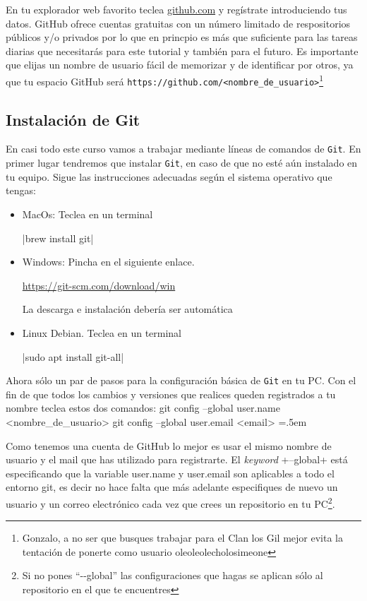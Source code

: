 \documentclass[a5paper,10pt]{article}
\newenvironment{cverbatim}
 {\SaveVerbatim{cverb}}
 {\endSaveVerbatim
  \flushleft\fboxrule=0pt\fboxsep=.5em
  \colorbox{bg}{\BUseVerbatim{cverb}}%
  \endflushleft
}
\begin{document}
    En tu explorador web favorito teclea \url{github.com} y regístrate introduciendo tus datos. GitHub ofrece cuentas gratuitas con un número limitado de respositorios públicos y/o privados por lo que en princpio es más que suficiente para las tareas diarias que necesitarás para este tutorial y también para el futuro. Es importante que elijas un nombre de usuario fácil de memorizar y de identificar por otros, ya que tu espacio GitHub será \verb+https://github.com/<nombre_de_usuario>+\footnote{Gonzalo, a no ser que busques trabajar para el Clan los Gil mejor evita la tentación de ponerte como usuario oleoleolecholosimeone}
    
  \subsection{Instalación de Git}
    En casi todo este curso vamos a trabajar mediante líneas de comandos de \verb+Git+. En primer lugar tendremos que instalar \verb+Git+, en caso de que no esté aún instalado en tu equipo. Sigue las instrucciones adecuadas según el sistema operativo que tengas: 
    
    \begin{itemize}
      \item MacOs: Teclea en un terminal
      
        \cverb|brew install git|

      \item Windows: Pincha en el siguiente enlace. 
      
      \url{https://git-scm.com/download/win}
      
      La descarga e instalación debería ser automática
        
      \item Linux Debian. Teclea en un terminal
      
        \cverb|sudo apt install git-all|
    \end{itemize}
    Ahora sólo un par de pasos para la configuración básica de \verb+Git+ en tu PC. Con el fin de que todos los cambios y versiones que realices queden registrados a tu nombre teclea estos dos comandos:
    \begin{cverbatim}
git config --global user.name <nombre_de_usuario>
git config --global user.email <email>
    \end{cverbatim}
      
    Como tenemos una cuenta de GitHub lo mejor es usar el mismo nombre de usuario y el mail que has utilizado para registrarte. El \emph{keyword} \cverb+--global+ está especificando que la variable user.name y user.email son aplicables a todo el entorno git, es decir no hace falta que más adelante especifiques de nuevo un usuario y un correo electrónico cada vez que crees un repositorio en tu PC\footnote{Si no pones ``-{}-global'' las configuraciones que hagas se aplican sólo al repositorio en el que te encuentres}.
\end{document}
